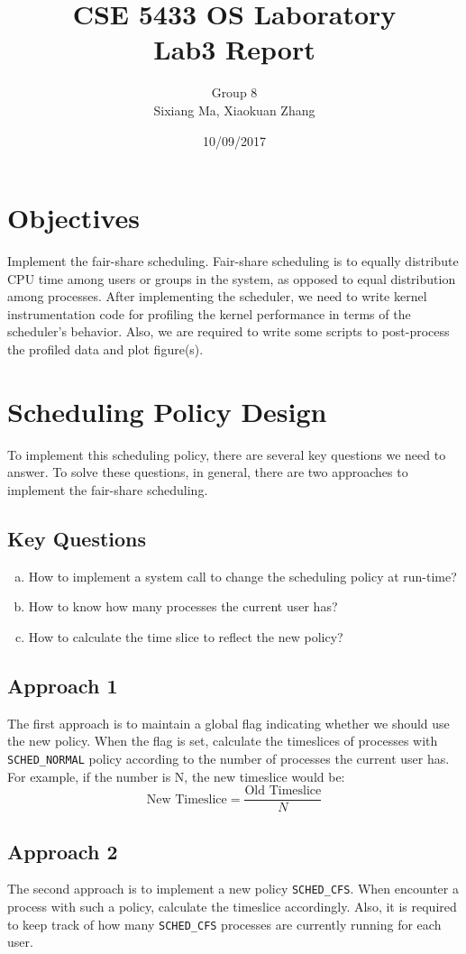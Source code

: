 \documentclass[11pt]{article}
\title{CSE 5433 OS Laboratory \\ Lab3 Report}
\author{Group 8 \\ Sixiang Ma, Xiaokuan Zhang}
\date{10/09/2017}
\begin{document}
\maketitle

\section{Objectives}
Implement the fair-share scheduling. Fair-share scheduling is to
equally distribute CPU time among users or groups in the system, as opposed to equal distribution among processes. After implementing the scheduler, we need to write kernel instrumentation code for profiling
the kernel performance in terms of the scheduler’s behavior. Also, we are required to write some scripts to post-process the profiled data and plot figure(s).

\section{Scheduling Policy Design}
To implement this scheduling policy, there are several key questions we need to answer. To solve these questions, in general, there are two approaches to implement the fair-share scheduling. 
\subsection{Key Questions}
\begin{enumerate}[(a)]
\item How to implement a system call to change the scheduling policy at run-time?
\item How to know how many processes the current user has?
\item How to calculate the time slice to reflect the new policy?
\end{enumerate}

\subsection{Approach 1}
The first approach is to maintain a global flag indicating whether we should use the new policy. When the flag is set, calculate the timeslices of processes with \texttt{SCHED\_NORMAL} policy according to the number of processes the current user has. For example, if the number is N, the new timeslice would be:
\begin{equation}
\text{New Timeslice} = \frac{\text{Old Timeslice}}{N}
\end{equation}
\subsection{Approach 2}
The second approach is to implement a new policy \texttt{SCHED\_CFS}. When encounter a process with such a policy, calculate the timeslice accordingly. Also, it is required to keep track of how many \texttt{SCHED\_CFS} processes are currently running for each user.
\end{document}
